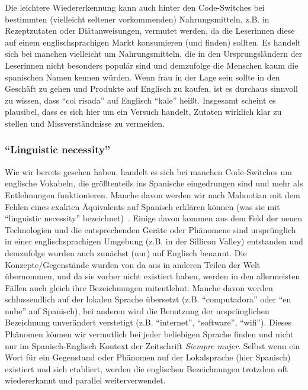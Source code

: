 Die leichtere Wiedererkennung kann auch hinter den Code-Switches bei bestimmten (vielleicht seltener vorkommenden) Nahrungsmitteln, z.B. in Rezeptzutaten oder Diätanweisungen, vermutet werden, da die Leserinnen diese auf einem englischsprachigen Markt konsumieren (und finden) sollten.
Es handelt sich bei manchen vielleicht um Nahrungsmitteln, die in den Ursprungsländern der Leserinnen nicht besonders populär sind und demzufolge die Menschen kaum die spanischen Namen kennen würden.
Wenn frau in der Lage sein sollte in den Geschäft zu gehen und Produkte auf Englisch zu kaufen, ist es durchaus sinnvoll zu wissen, dass ``col risada'' auf Englisch ``kale'' heißt.
Insgesamt scheint es plausibel, dass es sich hier um ein Versuch handelt, Zutaten wirklich klar zu stellen und Missverständnisse zu vermeiden.

\subsubsection{``Linguistic necessity''}
Wie wir bereits gesehen haben, handelt es sich bei manchen Code-Switches um englische Vokabeln, die größtenteils ins Spanische eingedrungen sind und mehr als Entlehnungen funktionieren.
Manche davon werden wir nach Mahootian mit dem Fehlen eines exakten Äquivalents auf Spanisch erklären können (was sie mit ``linguistic necessity'' bezeichnet)~\cite{Mahootian05}.
Einige davon kommen aus dem Feld der neuen Technologien und die entsprechenden Geräte oder Phänomene sind ursprünglich in einer englischsprachigen Umgebung (z.B. in der Sillicon Valley) entstanden und demzufolge wurden auch zunächst (nur) auf Englisch benannt.
Die Konzepte/Gegenstände wurden von da aus in anderen Teilen der Welt übernommen, und da sie vorher nicht existiert haben, werden in den allermeisten Fällen auch gleich ihre Bezeichnungen mitentlehnt.
Manche davon werden schlussendlich auf der lokalen Sprache übersetzt (z.B. ``computadora'' oder ``en nube'' auf Spanisch), bei anderen wird die Benutzung der ursprünglichen Bezeichnung unverändert verstetigt (z.B. ``internet'', ``software'', ``wifi'').
Dieses Phänomen können wir vermutlich bei jeder beliebigen Sprache finden und nicht nur im Spanisch-Englisch Kontext der Zeitschrift \textit{Siempre mujer}.
Selbst wenn ein Wort für ein Gegenstand oder Phänomen auf der Lokalsprache (hier Spanisch) existiert und sich etabliert, werden die englischen Bezeichnungen trotzdem oft wiedererkannt und parallel weiterverwendet.

